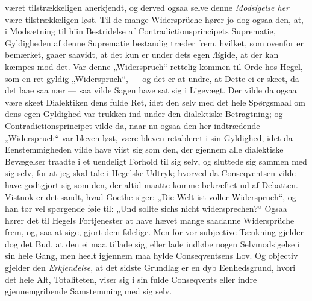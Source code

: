 \documentclass[12pt,a4paper]{book}
\newcommand{\apage}[1]{\marginnote{\footnotesize\textit{[#1]}}}
\begin{document}
været tilstrækkeligen anerkjendt, og derved ogsaa selve denne \emph{Modsigelse
her} være tilstrækkeligen løst. Til de mange Widersprüche hører jo dog ogsaa
den, at, i Modsætning til hiin Bestridelse af Contradictionsprincipets
Suprematie, Gyldigheden af denne Suprematie bestandig træder frem, hvilket,
som ovenfor er bemærket, gaaer saavidt, at det kun er under \apage{86} dets egen
Ægide, at der kan kæmpes mod det. Var denne „Widerspruch“ rettelig kommen
til Orde hos Hegel, som en ret gyldig „Widerspruch“, --- og det er at
undre, at Dette ei er skeet, da det laae saa nær --- saa vilde Sagen have
sat sig i Ligevægt. Der vilde da ogsaa være skeet Dialektiken dens fulde
Ret, idet den selv med det hele Spørgsmaal om dens egen Gyldighed var
trukken ind under den dialektiske Betragtning; og Contradictionsprincipet
vilde da, naar nu ogsaa den her indtrædende „Widerspruch“ var bleven løst,
være bleven retableret i sin Gyldighed, idet da Eenstemmigheden vilde have
viist sig som den, der gjennem alle dialektiske Bevægelser traadte i et
uendeligt Forhold til sig selv, og sluttede sig sammen med sig selv, for at
jeg skal tale i Hegelske Udtryk; hvorved da Conseqventsen vilde have
godtgjort sig som den, der altid maatte komme bekræftet ud af Debatten.
Vistnok er det sandt, hvad Goethe siger: „Die Welt ist voller
Widerspruch“, og han tør vel spørgende føie til: „Und sollte sichs nicht
widersprechen?“ Ogsaa hører det til Hegels Fortjenester at have hævet mange
saadanne Widersprüche frem, og, saa at sige, gjort dem følelige. Men for
vor subjective Tænkning gjelder dog det Bud, at den ei maa tillade sig,
eller lade indløbe nogen Selvmodsigelse i sin hele Gang, men heelt
igjennem maa hylde Conseqventsens Lov. Og objectiv gjelder den \emph{Erkjendelse},
at det sidste Grundlag er en dyb Eenhedsgrund, hvori det hele Alt,
Totaliteten, viser sig i sin fulde Conseqvents eller indre gjennemgribende
Samstemming med sig selv.
\end{document}

